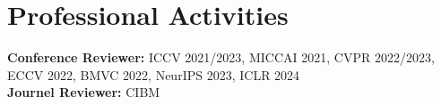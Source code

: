 \documentclass[letterpaper,11pt]{article}
\newcommand{\resumeArxivheading}[2]{
  \vspace{-2pt} \item\small{
    {\textbf{#1} \vspace{-2pt}}\\
    {\textit{\small#2}}
  }
}
\newcommand{\resumeSubHeadingListStart}{\begin{itemize}[leftmargin=0.15in, label={}]}
\newcommand{\resumeSubHeadingListEnd}{\end{itemize}}
\begin{document}


\section{Professional Activities}
  \vspace{2pt}
  \resumeSubHeadingListStart
    \small{\item{
        \textbf{Conference Reviewer: }{ICCV 2021/2023, MICCAI 2021, CVPR 2022/2023, ECCV 2022, BMVC 2022, NeurIPS 2023, ICLR 2024} \\ \vspace{3pt}
        \textbf{Journel Reviewer: }{CIBM}
        
    }}
  \resumeSubHeadingListEnd
\end{document}
